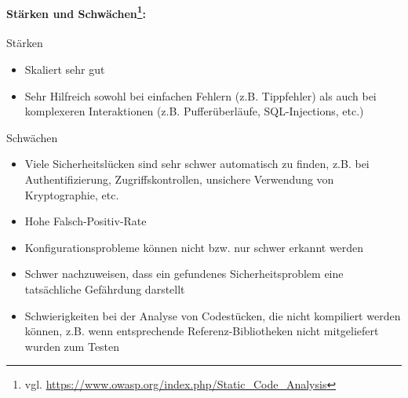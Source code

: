\paragraph{Stärken und Schwächen\footnote{vgl. \url{https://www.owasp.org/index.php/Static_Code_Analysis}}:} 
Stärken
\begin{itemize}
\item Skaliert sehr gut
\item Sehr Hilfreich sowohl bei einfachen Fehlern (z.B. Tippfehler) als auch bei komplexeren Interaktionen (z.B. Pufferüberläufe, SQL-Injections, etc.)
\end{itemize}
Schwächen
\begin{itemize}
\item Viele Sicherheitslücken sind sehr schwer automatisch zu finden, z.B. bei Authentifizierung, Zugriffskontrollen, unsichere Verwendung von Kryptographie, etc.
\item Hohe Falsch-Positiv-Rate
\item Konfigurationsprobleme können nicht bzw. nur schwer erkannt werden
\item Schwer nachzuweisen, dass ein gefundenes Sicherheitsproblem eine tatsächliche Gefährdung darstellt
\item Schwierigkeiten bei der Analyse von Codestücken, die nicht kompiliert werden können, z.B. wenn entsprechende Referenz-Bibliotheken nicht mitgeliefert wurden zum Testen
\end{itemize}
